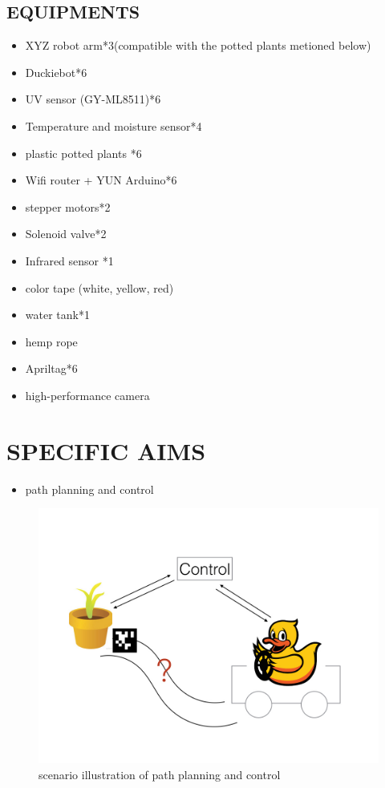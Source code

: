 \documentclass[a4paper, 10pt, conference]{ieeeconf}      %
\begin{document}
\subsection{EQUIPMENTS} 

\begin{itemize}
\item XYZ robot arm*3(compatible with the potted plants metioned below)
\item Duckiebot*6
\item UV sensor (GY-ML8511)*6
\item Temperature and moisture sensor*4
\item plastic potted plants *6
\item Wifi router + YUN Arduino*6
\item stepper motors*2
\item Solenoid valve*2
\item Infrared sensor *1
\item color tape (white, yellow, red)
\item water tank*1
\item hemp rope
\item Apriltag*6
\item high-performance camera
\end{itemize}






\section{SPECIFIC AIMS}



\begin{itemize}
\item path planning and control
\end{itemize}


\begin{figure}[htbp] %
\includegraphics[width=0.8\columnwidth]{csp-aim-scenario.jpg}
\centering
\caption{scenario illustration of path planning and control}
\end{figure}
\end{document}
